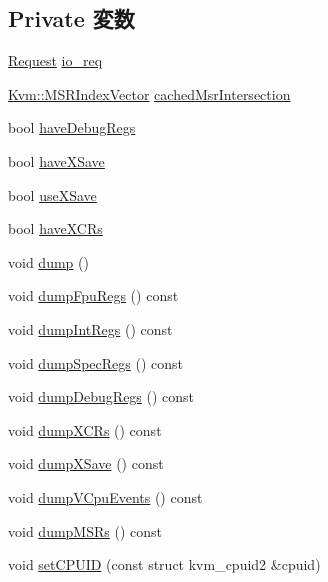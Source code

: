 \subsection*{Private 変数}
\begin{DoxyCompactItemize}
\item 
\hyperlink{classRequest}{Request} \hyperlink{classX86KvmCPU_ab9e917350d26247b9eb4153e891f348a}{io\_\-req}
\item 
\hyperlink{classstd_1_1vector}{Kvm::MSRIndexVector} \hyperlink{classX86KvmCPU_aa0f07c7b56f9fd1e68e7ebdc2e3a9428}{cachedMsrIntersection}
\end{DoxyCompactItemize}
\label{_amgrpd41d8cd98f00b204e9800998ecf8427e}
 \begin{DoxyCompactItemize}
\item 
bool \hyperlink{classX86KvmCPU_ab7c96fcfb73a6d3ca276a6dce2ee76bb}{haveDebugRegs}
\item 
bool \hyperlink{classX86KvmCPU_ac0fd3f6d7cf7fa1132de384a5953228c}{haveXSave}
\item 
bool \hyperlink{classX86KvmCPU_ab966ae6cc1b380746dcb2713f2559e65}{useXSave}
\item 
bool \hyperlink{classX86KvmCPU_acb9f794b9c9ccc1422b1b5ba9e4823b6}{haveXCRs}
\item 
void \hyperlink{classX86KvmCPU_accd2600060dbaee3a3b41aed4034c63c}{dump} ()
\item 
void \hyperlink{classX86KvmCPU_aa1a18283b9b8e7cb68c16a67fec2259c}{dumpFpuRegs} () const 
\item 
void \hyperlink{classX86KvmCPU_af077d8e3ed2e320aa9a94718f0757a37}{dumpIntRegs} () const 
\item 
void \hyperlink{classX86KvmCPU_a8a8d697d582ced238ec0dfca97be2a75}{dumpSpecRegs} () const 
\item 
void \hyperlink{classX86KvmCPU_a90a32da18747ec95f59f6042fa5b448d}{dumpDebugRegs} () const 
\item 
void \hyperlink{classX86KvmCPU_a80e6ff34faeb5d05343e77809a203ec8}{dumpXCRs} () const 
\item 
void \hyperlink{classX86KvmCPU_a84c89612fa5d62bf131915036e99c8ee}{dumpXSave} () const 
\item 
void \hyperlink{classX86KvmCPU_ab17603ee90366735647c3ed5407e23ec}{dumpVCpuEvents} () const 
\item 
void \hyperlink{classX86KvmCPU_ad68abbbf4ef33ea6b6ed643fee2c13e6}{dumpMSRs} () const 
\item 
void \hyperlink{classX86KvmCPU_ae1aa75790696eb8780d159812f607921}{setCPUID} (const struct kvm\_\-cpuid2 \&cpuid)

\end{DoxyCompactItemize}
